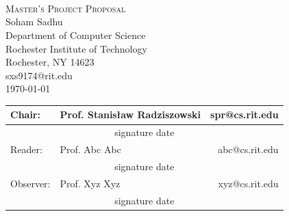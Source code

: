 \documentclass[12pt]{artikel3}                  %
\begin{document}
\begin{titlepage}
\begin{center}

\textsc{\LARGE }\\[0.2cm]
\textsc{\LARGE }\\[0.2cm]
\textsc{\LARGE }\\[1.2cm]

\textsc{\Large Master's Project Proposal}\\[1cm]

\large{Soham Sadhu}\\
\large{Department of Computer Science}\\
\large{Rochester Institute of Technology}\\
\large{Rochester, NY 14623}\\
\large{sxs9174@rit.edu}\\[0.5cm]

{\large \today}\\[1cm]

\begin{tabular}{l l r}
    Chair: & Prof. Stanis{\l}aw Radziszowski & spr@cs.rit.edu\\[1.5cm] \hline
    \multicolumn{3}{c}{signature \hspace{6cm} date}\\[1cm]
    Reader: & Prof. Abc Abc & abc@cs.rit.edu\\[1.5cm] \hline
    \multicolumn{3}{c}{signature \hspace{6cm} date}\\[1cm]
    Observer: & Prof. Xyz Xyz & xyz@cs.rit.edu\\[1.5cm] \hline
    \multicolumn{3}{c}{signature \hspace{6cm} date}\\[1cm]
\end{tabular}


\vfill

\end{center}
\end{titlepage}
\end{document}
